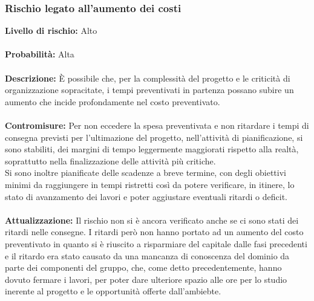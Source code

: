 	\subsubsection{Rischio legato all'aumento dei costi}
	\label{AnalisiDeiRischi_Costi}
		\textbf{Livello di rischio:} Alto
		\\ \\
		\textbf{Probabilità:} Alta
		\\ \\
		\textbf{Descrizione:} È possibile che, per la complessità del progetto e le criticità di organizzazione sopracitate, i tempi preventivati in partenza possano subire un aumento che incide profondamente nel costo preventivato.
		\\ \\
		\textbf{Contromisure:} Per non eccedere la spesa preventivata e non ritardare i tempi di consegna previsti per l'ultimazione del progetto, nell'attività di pianificazione, si sono stabiliti, dei margini di tempo leggermente maggiorati rispetto alla realtà, soprattutto nella finalizzazione delle attività più critiche.\\
		Si sono inoltre pianificate delle scadenze a breve termine, con degli obiettivi minimi da raggiungere in tempi ristretti così da potere verificare, in itinere, lo stato di avanzamento dei lavori e poter aggiustare eventuali ritardi o deficit.
		\\ \\
		\textbf{Attualizzazione:} Il rischio non si è ancora verificato anche se ci sono stati dei ritardi nelle consegne. I ritardi però non hanno portato ad un aumento del costo preventivato in quanto si è riuscito a risparmiare del capitale dalle fasi precedenti e il ritardo era stato causato da una mancanza di conoscenza del dominio da parte dei componenti del gruppo, che, come detto precedentemente, hanno dovuto fermare i lavori, per poter dare ulteriore spazio alle ore per lo studio inerente al progetto e le opportunità offerte dall'ambiebte.
		

